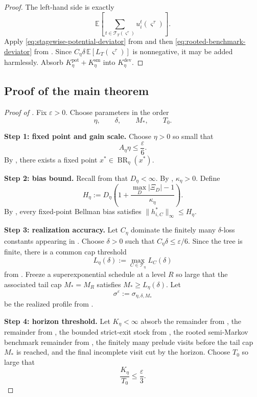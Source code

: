 \documentclass[12pt]{article}
\theoremstyle{definition}
\newcommand{\eps}{\varepsilon}
\newcommand{\E}{\mathbb{E}}
\newcommand{\1}{\mathbf{1}}
\newcommand{\cT}{\mathcal{T}}
\DeclareMathOperator{\BR}{BR}
\begin{document}
\begin{proof}
The left-hand side is exactly
\[
\E\left[
\sum_{t\in\mathcal T_T(\varsigma^\tau)}
u_i^t(\varsigma^\tau)
\right].
\]
Apply \eqref{eq:stagewise-potential-deviator} from
 and then \eqref{eq:rooted-benchmark-deviator} from
. Since $C_\eta\delta\,\E[L_T(\varsigma^\tau)]$ is
nonnegative, it may be added harmlessly. Absorb
$K_\eta^{\mathrm{pot}}+K_\eta^{\mathrm{sm}}$ into $K_\eta^{\mathrm{dev}}$.
\end{proof}

\subsection{Proof of the main theorem}


\begin{proof}[Proof of ]
Fix $\eps>0$. Choose parameters in the order
\[
\eta,\qquad \delta,\qquad M_*,\qquad T_0.
\]

\smallskip
\noindent\textbf{Step 1: fixed point and gain scale.}
Choose $\eta>0$ so small that
\[
A_\eta\eta\le \frac{\eps}{6}.
\]
By , there exists a fixed point $x^*\in\BR_\eta(x^*)$.

\smallskip
\noindent\textbf{Step 2: bias bound.}
Recall from  that $D_\eta<\infty$. By
, $\kappa_\eta>0$. Define
\[
H_\eta:=D_\eta\left(1+\frac{\max_D|\Xi_D|-1}{\kappa_\eta}\right).
\]
By , every fixed-point Bellman bias satisfies
$\|h_{i,C}^*\|_\infty\le H_\eta$.

\smallskip
\noindent\textbf{Step 3: realization accuracy.}
Let $C_\eta$ dominate the finitely many $\delta$-loss constants appearing in
. Choose
$\delta>0$ such that $C_\eta\delta\le \eps/6$. Since the tree is finite, there
is a common cap threshold
\[
L_\eta(\delta):=\max_{C\in\cT_\eta}L_C(\delta)
\]
from . Freeze a superexponential schedule at a level
$R$ so large that the associated tail cap $M_*=M_R$ satisfies
$M_*\ge L_\eta(\delta)$. Let
\[
\sigma^\eps:=\sigma_{\eta,\delta,M_*}
\]
be the realized profile from .

\smallskip
\noindent\textbf{Step 4: horizon threshold.}
Let $K_\eta<\infty$ absorb the remainder from , the
remainder from , the bounded strict-exit stock from
, the rooted semi-Markov benchmark remainder from
, the finitely many prelude visits before the tail
cap $M_*$ is reached, and the final incomplete visit cut by the horizon.
Choose $T_0$ so large that
\[
\frac{K_\eta}{T_0}\le \frac{\eps}{3}.
\]


\end{proof}
\end{document}
